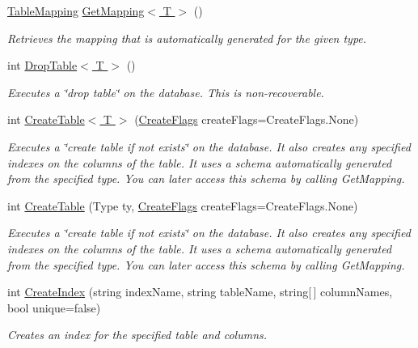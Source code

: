 \begin{DoxyCompactItemize}
\hyperlink{class_s_q_lite_1_1_table_mapping}{Table\+Mapping} \hyperlink{class_s_q_lite_1_1_s_q_lite_connection_adf0ed08567e1ca36e4fda72c94ede544}{Get\+Mapping$<$ T $>$} ()
\begin{DoxyCompactList}\small\item\em Retrieves the mapping that is automatically generated for the given type. \end{DoxyCompactList}\item 
int \hyperlink{class_s_q_lite_1_1_s_q_lite_connection_a783032226b2db2ebd6417f21abe9cd5a}{Drop\+Table$<$ T $>$} ()
\begin{DoxyCompactList}\small\item\em Executes a \char`\"{}drop table\char`\"{} on the database. This is non-\/recoverable. \end{DoxyCompactList}\item 
int \hyperlink{class_s_q_lite_1_1_s_q_lite_connection_abc8fda93774fb74dd2f97e9549eb46b5}{Create\+Table$<$ T $>$} (\hyperlink{namespace_s_q_lite_a5ada328810363319c85c3e0c28c67479}{Create\+Flags} create\+Flags=Create\+Flags.\+None)
\begin{DoxyCompactList}\small\item\em Executes a \char`\"{}create table if not exists\char`\"{} on the database. It also creates any specified indexes on the columns of the table. It uses a schema automatically generated from the specified type. You can later access this schema by calling Get\+Mapping. \end{DoxyCompactList}\item 
int \hyperlink{class_s_q_lite_1_1_s_q_lite_connection_abfd7ba959c93db259983427b5e7ee05a}{Create\+Table} (Type ty, \hyperlink{namespace_s_q_lite_a5ada328810363319c85c3e0c28c67479}{Create\+Flags} create\+Flags=Create\+Flags.\+None)
\begin{DoxyCompactList}\small\item\em Executes a \char`\"{}create table if not exists\char`\"{} on the database. It also creates any specified indexes on the columns of the table. It uses a schema automatically generated from the specified type. You can later access this schema by calling Get\+Mapping. \end{DoxyCompactList}\item 
int \hyperlink{class_s_q_lite_1_1_s_q_lite_connection_a006cda01a29a2f202be1659cbf3810a8}{Create\+Index} (string index\+Name, string table\+Name, string\mbox{[}$\,$\mbox{]} column\+Names, bool unique=false)
\begin{DoxyCompactList}\small\item\em Creates an index for the specified table and columns. \end{DoxyCompactList}\item 

\end{DoxyCompactItemize}
